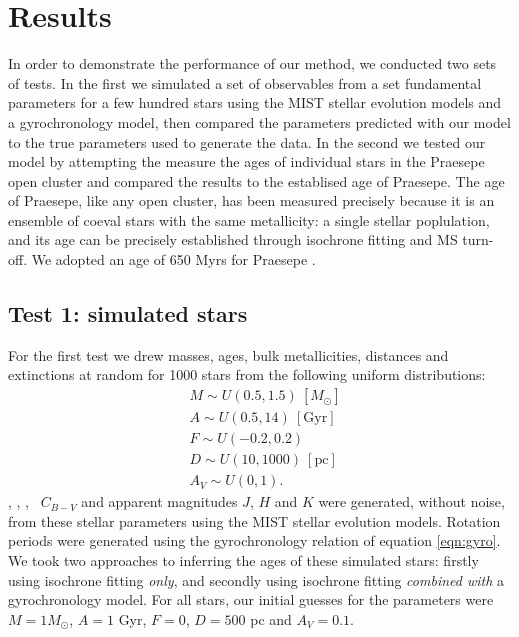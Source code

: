 \section{Results}
\label{section:results}

In order to demonstrate the performance of our method, we conducted two sets
of tests.
In the first we simulated a set of observables from a set fundamental
parameters for a few hundred stars using the MIST stellar evolution models and
a gyrochronology model, then compared the parameters predicted with our model
to the true parameters used to generate the data.
In the second we tested our model by attempting the measure the ages of
individual stars in the Praesepe open cluster and compared the results to the
establised age of Praesepe.
The age of Praesepe, like any open cluster, has been measured precisely
because it is an ensemble of coeval stars with the same metallicity: a single
stellar poplulation, and its age can be precisely established through
isochrone fitting and MS turn-off.
We adopted an age of 650 Myrs for Praesepe \citep{fossati2008, perryman1998}.

\subsection{Test 1: simulated stars}
For the first test we drew masses, ages, bulk metallicities, distances and
extinctions at random for 1000 stars from the following uniform distributions:
\begin{eqnarray}
& M \sim U(0.5, 1.5)~[M_\odot] \\
& A \sim U(0.5, 14)\mathrm{~[Gyr]} \\
& F \sim U(-0.2, 0.2) \\
& D \sim U(10, 1000)~\mathrm{[pc]} \\
& A_V \sim U(0, 1).
\end{eqnarray}
\teff, \logg, \fhat, \pmega\, $C_{B-V}$ and apparent magnitudes $J$, $H$ and
$K$ were generated, without noise, from these stellar parameters using the
MIST stellar evolution models.
Rotation periods were generated using the gyrochronology relation of
equation \ref{eqn:gyro}.
We took two approaches to inferring the ages of these simulated stars:
firstly using isochrone fitting {\it only}, and secondly using isochrone
fitting {\it combined with} a gyrochronology model.
For all stars, our initial guesses for the parameters were $M = 1M_\odot$,
$A = 1$ Gyr, $F = 0$, $D = 500$ pc and $A_V = 0.1$.

